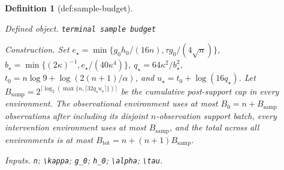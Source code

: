 \documentclass{article}
\newtheorem{definition}{Definition}
\begin{document}
\begin{definition}[def:sample-budget]\label{def:sample-budget}
\par\smallskip\noindent\emph{Defined object.} \texttt{terminal sample budget}
\par\smallskip\noindent\emph{Construction.} Set \(e_{\star}=\min\{g_0h_0/(16n),\tau g_0/(4\sqrt n)\}\), \(b_{\star}=\min\{(2\kappa)^{-1},e_{\star}/(40\kappa^4)\}\), \(q_{\star}=64\kappa^2/b_{\star}^2\), \(t_0=n\log 9+\log(2(n+1)/\alpha)\), and \(u_{\star}=t_0+\log(16q_{\star})\). Let \(B_{\mathrm{samp}}=2^{\lceil\log_2(\max\{n,\lceil32q_{\star}u_{\star}\rceil\})\rceil}\) be the cumulative post-support cap in every environment. The observational environment uses at most \(B_0=n+B_{\mathrm{samp}}\) observations after including its disjoint \(n\)-observation support batch, every intervention environment uses at most \(B_{\mathrm{samp}}\), and the total across all environments is at most \(B_{\mathrm{tot}}=n+(n+1)B_{\mathrm{samp}}\).
\par\smallskip\noindent\emph{Inputs.} \texttt{n}; \texttt{\textbackslash{}\allowbreak{}kappa}; \texttt{g\_\allowbreak{}0}; \texttt{h\_\allowbreak{}0}; \texttt{\textbackslash{}\allowbreak{}alpha}; \texttt{\textbackslash{}\allowbreak{}tau}.
\end{definition}
\end{document}
